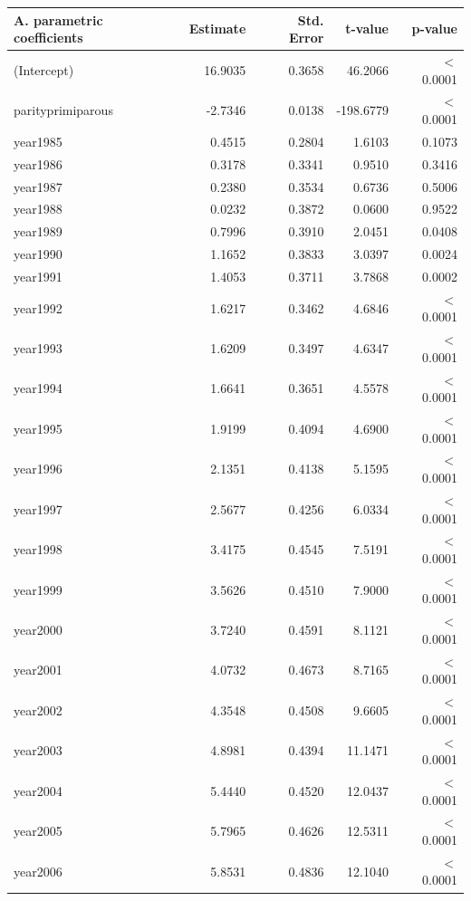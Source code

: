     \begin{table}[H]
    \centering
    \begin{tabular}{lrrrr}
    \textbf{A. parametric coefficients} & Estimate & Std. Error & t-value & p-value \\ 
       \hline
       \hline
      (Intercept) & 16.9035 & 0.3658 & 46.2066 & $<$ 0.0001 \\ 
      parityprimiparous & -2.7346 & 0.0138 & -198.6779 & $<$ 0.0001 \\ 
      year1985 & 0.4515 & 0.2804 & 1.6103 & 0.1073 \\ 
      year1986 & 0.3178 & 0.3341 & 0.9510 & 0.3416 \\ 
      year1987 & 0.2380 & 0.3534 & 0.6736 & 0.5006 \\ 
      year1988 & 0.0232 & 0.3872 & 0.0600 & 0.9522 \\ 
      year1989 & 0.7996 & 0.3910 & 2.0451 & 0.0408 \\ 
      year1990 & 1.1652 & 0.3833 & 3.0397 & 0.0024 \\ 
      year1991 & 1.4053 & 0.3711 & 3.7868 & 0.0002 \\ 
      year1992 & 1.6217 & 0.3462 & 4.6846 & $<$ 0.0001 \\ 
      year1993 & 1.6209 & 0.3497 & 4.6347 & $<$ 0.0001 \\ 
      year1994 & 1.6641 & 0.3651 & 4.5578 & $<$ 0.0001 \\ 
      year1995 & 1.9199 & 0.4094 & 4.6900 & $<$ 0.0001 \\ 
      year1996 & 2.1351 & 0.4138 & 5.1595 & $<$ 0.0001 \\ 
      year1997 & 2.5677 & 0.4256 & 6.0334 & $<$ 0.0001 \\ 
      year1998 & 3.4175 & 0.4545 & 7.5191 & $<$ 0.0001 \\ 
      year1999 & 3.5626 & 0.4510 & 7.9000 & $<$ 0.0001 \\ 
      year2000 & 3.7240 & 0.4591 & 8.1121 & $<$ 0.0001 \\ 
      year2001 & 4.0732 & 0.4673 & 8.7165 & $<$ 0.0001 \\ 
      year2002 & 4.3548 & 0.4508 & 9.6605 & $<$ 0.0001 \\ 
      year2003 & 4.8981 & 0.4394 & 11.1471 & $<$ 0.0001 \\ 
      year2004 & 5.4440 & 0.4520 & 12.0437 & $<$ 0.0001 \\ 
      year2005 & 5.7965 & 0.4626 & 12.5311 & $<$ 0.0001 \\ 
      year2006 & 5.8531 & 0.4836 & 12.1040 & $<$ 0.0001 \\ 

\end{tabular}
\end{table}
